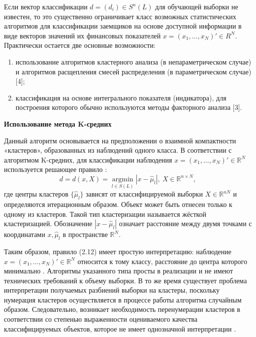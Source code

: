 \documentclass[14pt,a4paper]{extarticle}
\begin{document}
Если вектор классификации $d = (d_{i}) \in S^{n}(L)$ для обучающей выборки не известен, то это существенно ограничивает класс возможных статистических алгоритмов для классификации заемщиков на основе доступной информации в виде векторов значений их финансовых показателей $x = (x_{1},\ldots,x_{N})' \in R^{N}$. Практически остается две основные возможности:
\begin{enumerate}
    \item использование алгоритмов кластерного анализа (в непараметрическом случае) и алгоритмов расщепления смесей распределения (в параметрическом случае) [4];
    \item классификация на основе интегрального показателя (индикатора), для построения которого обычно используются методы факторного анализа [3].
\end{enumerate}

\textbf{Использование метода K-средних}

Данный алгоритм основывается на предположении о взаимной компактности «кластеров», образованных из наблюдений одного класса. В соответствии с алгоритмом K-средних, для классификации наблюдения $x = (x_{1},\ldots,x_{N})' \in \mathbb{R}^{N}$ используется решающее правило \cite{malugin2013}:
\begin{equation}
d = d(x,X) = \underset{l \in S(L)}{\operatorname{argmin}} \left| x - \hat{\mu}_{l} \right|,\ X \in \mathbb{R}^{n \times N},
\end{equation}
где центры кластеров $\{\hat{\mu}_{l}\}$ зависят от классифицируемой выборки $X \in \mathbb{R}^{nN}$ и определяются итерационным образом. Объект может быть отнесен только к одному из кластеров. Такой тип кластеризации называется жёсткой кластеризацией. Обозначение $|x - \hat{\mu}_{l}|$ означает расстояние между двумя точками с координатами $x,\hat{\mu}_{l}$ в пространстве $\mathbb{R}^{N}$.

Таким образом, правило (2.12) имеет простую интерпретацию: наблюдение $x = (x_{1},\ldots,x_{N})' \in \mathbb{R}^{N}$ относится к тому классу, расстояние до центра которого минимально \cite{kharin2008}. Алгоритмы указанного типа просты в реализации и не имеют технических требований к объему выборки. В то же время существует проблема интерпретации получаемых разбиений выборки на кластеры, поскольку нумерация кластеров осуществляется в процессе работы алгоритма случайным образом. Следовательно, возникает необходимость перенумерации кластеров в соответствии со степенью выраженности оцениваемого качества классифицируемых объектов, которое не имеет однозначной интерпретации \cite{malugin2013}.
\end{document}
